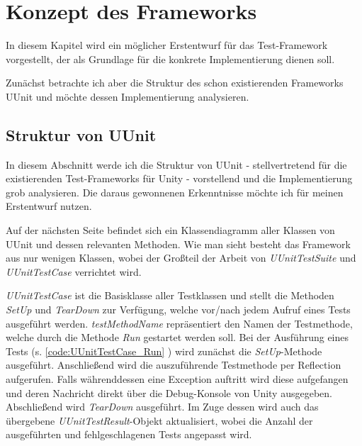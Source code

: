 \chapter{Konzept des Frameworks}

In diesem Kapitel wird ein möglicher Erstentwurf für das Test-Framework vorgestellt, der als Grundlage für die konkrete Implementierung dienen soll.

Zunächst betrachte ich aber die Struktur des schon existierenden Frameworks UUnit und möchte dessen Implementierung analysieren.

\section{Struktur von UUnit}

In diesem Abschnitt werde ich die Struktur von UUnit - stellvertretend für die existierenden Test-Frameworks für Unity - vorstellend und die Implementierung grob analysieren. Die daraus gewonnenen Erkenntnisse möchte ich für meinen Erstentwurf nutzen.

Auf der nächsten Seite befindet sich ein Klassendiagramm aller Klassen von UUnit und dessen relevanten Methoden. Wie man sieht besteht das Framework aus nur wenigen Klassen, wobei der Großteil der Arbeit von \textit{UUnitTestSuite} und \textit{UUnitTestCase} verrichtet wird.

\textit{UUnitTestCase} ist die Basisklasse aller Testklassen und stellt die Methoden \textit{SetUp} und \textit{TearDown} zur Verfügung, welche vor/nach jedem Aufruf eines Tests ausgeführt werden. \textit{testMethodName} repräsentiert den Namen der Testmethode, welche durch die Methode \textit{Run} gestartet werden soll. Bei der Ausführung eines Tests (s. \autoref{code:UUnitTestCase_Run} ) wird zunächst die \textit{SetUp}-Methode ausgeführt. Anschließend wird die auszuführende Testmethode per Reflection aufgerufen. Falls währenddessen eine Exception auftritt wird diese aufgefangen und deren Nachricht direkt über die Debug-Konsole von Unity ausgegeben. Abschließend wird \textit{TearDown} ausgeführt. Im Zuge dessen wird auch das übergebene \textit{UUnitTestResult}-Objekt aktualisiert, wobei die Anzahl der ausgeführten und fehlgeschlagenen Tests angepasst wird.

